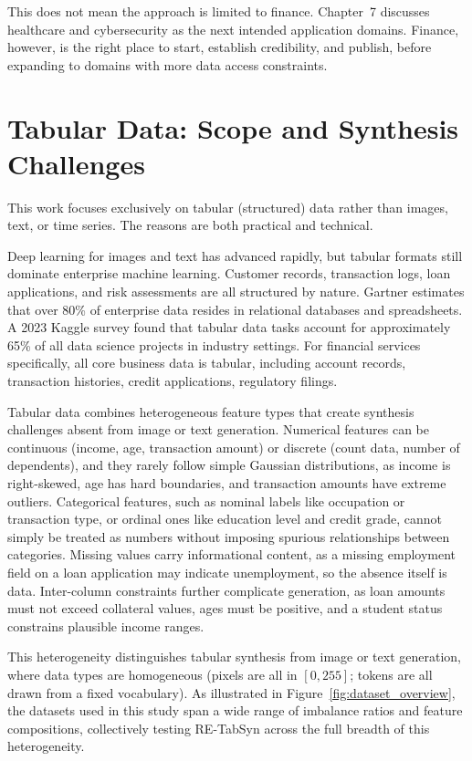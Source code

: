 This does not mean the approach is limited to finance. Chapter~7 discusses healthcare and cybersecurity as the next intended application domains. Finance, however, is the right place to start, establish credibility, and publish, before expanding to domains with more data access constraints.

\section{Tabular Data: Scope and Synthesis Challenges}

This work focuses exclusively on tabular (structured) data rather than images, text, or time series. The reasons are both practical and technical.

Deep learning for images and text has advanced rapidly, but tabular formats still dominate enterprise machine learning. Customer records, transaction logs, loan applications, and risk assessments are all structured by nature. Gartner estimates that over 80\% of enterprise data resides in relational databases and spreadsheets. A 2023 Kaggle survey found that tabular data tasks account for approximately 65\% of all data science projects in industry settings. For financial services specifically, all core business data is tabular, including account records, transaction histories, credit applications, regulatory filings.

Tabular data combines heterogeneous feature types that create synthesis challenges absent from image or text generation. Numerical features can be continuous (income, age, transaction amount) or discrete (count data, number of dependents), and they rarely follow simple Gaussian distributions, as income is right-skewed, age has hard boundaries, and transaction amounts have extreme outliers. Categorical features, such as nominal labels like occupation or transaction type, or ordinal ones like education level and credit grade, cannot simply be treated as numbers without imposing spurious relationships between categories. Missing values carry informational content, as a missing employment field on a loan application may indicate unemployment, so the absence itself is data. Inter-column constraints further complicate generation, as loan amounts must not exceed collateral values, ages must be positive, and a student status constrains plausible income ranges.

This heterogeneity distinguishes tabular synthesis from image or text generation, where data types are homogeneous (pixels are all in $[0, 255]$; tokens are all drawn from a fixed vocabulary). As illustrated in Figure~\ref{fig:dataset_overview}, the datasets used in this study span a wide range of imbalance ratios and feature compositions, collectively testing RE-TabSyn across the full breadth of this heterogeneity.

